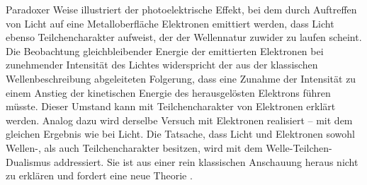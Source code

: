 Paradoxer Weise illustriert der photoelektrische Effekt, bei dem durch Auftreffen von Licht auf eine Metalloberfläche Elektronen emittiert werden, dass Licht ebenso Teilchencharakter aufweist, der der Wellennatur zuwider zu laufen scheint. Die Beobachtung gleichbleibender Energie der emittierten Elektronen bei zunehmender Intensität des Lichtes widerspricht der aus der klassischen Wellenbeschreibung abgeleiteten Folgerung, dass eine Zunahme der Intensität zu einem Anstieg der kinetischen Energie des herausgelösten Elektrons führen müsste. Dieser Umstand kann mit Teilchencharakter von Elektronen erklärt werden. Analog dazu wird derselbe Versuch mit Elektronen realisiert -- mit dem gleichen Ergebnis wie bei Licht.
Die Tatsache, dass Licht und Elektronen sowohl Wellen-, als auch Teilchencharakter besitzen, wird mit dem Welle-Teilchen-Dualismus addressiert. Sie ist aus einer rein klassischen Anschauung heraus nicht zu erklären und fordert eine neue Theorie \cite{Feynman_lectures70}.


